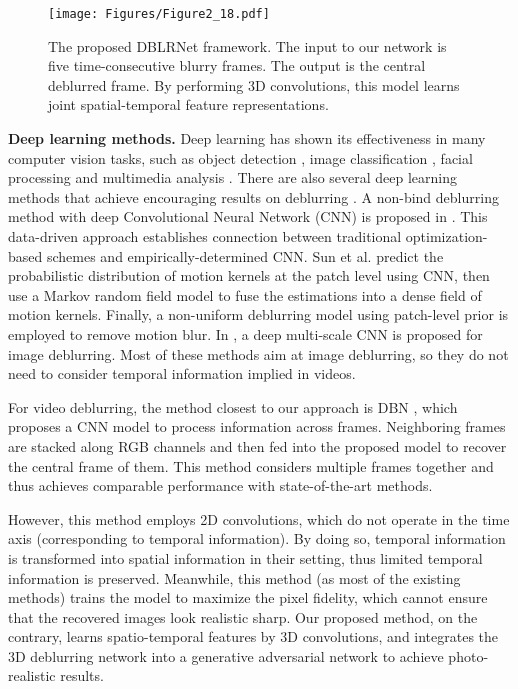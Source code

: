 \documentclass[journal]{IEEEtran}
\begin{document}
\begin{figure*}[ht]
	\centering
	\texttt{[image: Figures/Figure2\_18.pdf]}
	\caption{The proposed DBLRNet framework. The input to our network is five time-consecutive blurry frames. The output is the central deblurred frame. By performing 3D convolutions, this model learns joint spatial-temporal feature representations.}
	\label{figure2}
\end{figure*}


\textbf{Deep learning methods.} Deep learning has shown its effectiveness in many computer vision tasks, such as object detection \cite{ren2015faster}, image classification \cite{krizhevsky2012imagenet,simonyan2014very,szegedy2015going,he2016deep}, facial processing \cite{sun2013deep,sun2014deep,sun2015learning,zhang122015kinship,zhang2017facial} and multimedia analysis \cite{ji20133d,simonyan2014two,ledig2016photo}. There are also several deep learning methods that achieve encouraging results on deblurring \cite{xu2014deep,sun2015learning,nah2016deep,su2016deep,Nimisha_2017_ICCV,kim2017online,kim2017dynamic}. A non-bind deblurring method with deep Convolutional Neural Network (CNN) is proposed in \cite{xu2014deep}. This data-driven approach establishes connection between traditional optimization-based schemes and empirically-determined CNN. Sun et al. \cite{sun2015learning} predict the probabilistic distribution of motion kernels at the patch level using CNN, then use a Markov random field model to fuse the estimations into a dense field of motion kernels. Finally, a non-uniform deblurring model using patch-level prior is employed to remove motion blur. In \cite{nah2016deep}, a deep multi-scale CNN is proposed for image deblurring. Most of these methods aim at image deblurring, so they do not need to consider temporal information implied in videos.

For video deblurring, the method closest to our approach is DBN \cite{su2016deep}, which proposes a CNN model to process information across frames. Neighboring frames are stacked along RGB channels and then fed into the proposed model to recover the central frame of them. This method considers multiple frames together and thus achieves comparable performance with state-of-the-art methods.

However, this method employs 2D convolutions, which do not operate in the time axis (corresponding to temporal information). By doing so, temporal information is transformed into spatial information in their setting, thus limited temporal information is preserved. Meanwhile, this method (as most of the existing methods) trains the model to maximize the pixel fidelity, which cannot ensure that the recovered images look realistic sharp. Our proposed method, on the contrary, learns spatio-temporal features by 3D convolutions, and integrates the 3D deblurring network into a generative adversarial network to achieve photo-realistic results.
\end{document}
